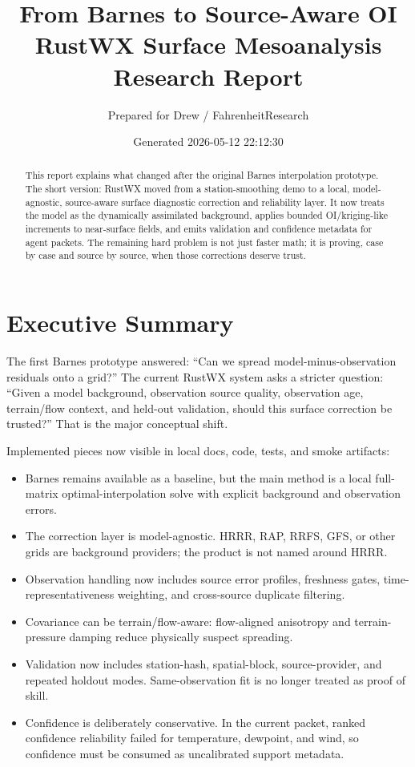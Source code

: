 \documentclass[11pt]{article}
\title{\textbf{From Barnes to Source-Aware OI}\\RustWX Surface Mesoanalysis Research Report}
\author{Prepared for Drew / FahrenheitResearch}
\date{Generated 2026-05-12 22:12:30}
\begin{document}
\maketitle

\begin{abstract}
This report explains what changed after the original Barnes interpolation prototype.
The short version: RustWX moved from a station-smoothing demo to a local, model-agnostic,
source-aware surface diagnostic correction and reliability layer. It now treats the
model as the dynamically assimilated background, applies bounded OI/kriging-like
increments to near-surface fields, and emits validation and confidence metadata for
agent packets. The remaining hard problem is not just faster math; it is proving,
case by case and source by source, when those corrections deserve trust.
\end{abstract}

\section{Executive Summary}

The first Barnes prototype answered: ``Can we spread model-minus-observation residuals
onto a grid?'' The current RustWX system asks a stricter question: ``Given a model
background, observation source quality, observation age, terrain/flow context, and
held-out validation, should this surface correction be trusted?'' That is the major
conceptual shift.

Implemented pieces now visible in local docs, code, tests, and smoke artifacts:
\begin{itemize}
  \item Barnes remains available as a baseline, but the main method is a local
  full-matrix optimal-interpolation solve with explicit background and observation
  errors.
  \item The correction layer is model-agnostic. HRRR, RAP, RRFS, GFS, or other grids
  are background providers; the product is not named around HRRR.
  \item Observation handling now includes source error profiles, freshness gates,
  time-representativeness weighting, and cross-source duplicate filtering.
  \item Covariance can be terrain/flow-aware: flow-aligned anisotropy and
  terrain-pressure damping reduce physically suspect spreading.
  \item Validation now includes station-hash, spatial-block, source-provider, and
  repeated holdout modes. Same-observation fit is no longer treated as proof of skill.
  \item Confidence is deliberately conservative. In the current packet, ranked
  confidence reliability failed for temperature, dewpoint, and wind, so confidence
  must be consumed as uncalibrated support metadata.
\end{itemize}
\end{document}
